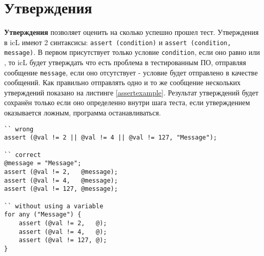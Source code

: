 \section{Утверждения}

{\bf Утверждения} позволяет оценить на сколько успешно прошел тест. Утверждения в icL имеют 2 синтаксисы: \texttt{assert (condition)} и \texttt{assert (condition, message)}. В первом присутствует только условие \texttt{condition}, если оно равно \false{} или \void, то icL будет утверждать что есть проблема в тестированным ПО, отправляя сообщение \texttt{message}, если оно отсутствует - условие будет отправлено в качестве сообщений. Как правильно отправлять одно и то же сообщение нескольких утверждений показано на листинге \ref{assertexample}. Результат утверждений будет сохранён только если оно определенно внутри шага теста, если утверждением оказывается ложным, программа останавливаться.

\begin{sourcecode}
\label{assertexample}
\begin{verbatim}
`` wrong
assert (@val != 2 || @val != 4 || @val != 127, "Message");

`` correct
@message = "Message";
assert (@val != 2,   @message);
assert (@val != 4,   @message);
assert (@val != 127, @message);

`` without using a variable
for any ("Message") {
	assert (@val != 2,   @);
	assert (@val != 4,   @);
	assert (@val != 127, @);
}
\end{verbatim}
\end{sourcecode}


